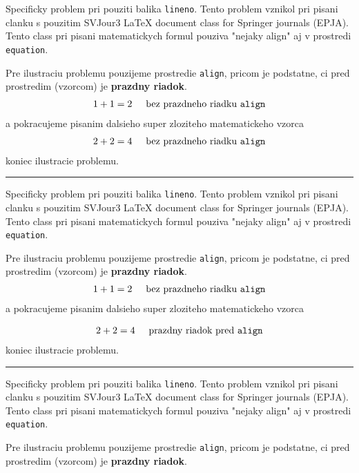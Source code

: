 \documentclass[twocolumn]{article}
\begin{document}
Specificky problem pri pouziti balika \texttt{lineno}. Tento problem vznikol pri
pisani clanku s pouzitim SVJour3 LaTeX document class for Springer journals
(EPJA). Tento class pri pisani matematickych formul pouziva "nejaky align" aj v
prostredi \texttt{equation}.

Pre ilustraciu problemu pouzijeme prostredie \texttt{align}, pricom je
podstatne, ci pred prostredim (vzorcom) je \textbf{prazdny riadok}.
\begin{align}
  1+1=2 \hspace{0.5cm}\text{bez prazdneho riadku }\texttt{align}
\end{align}
a pokracujeme pisanim dalsieho super zloziteho matematickeho vzorca
\begin{align}
  2+2=4 \hspace{0.5cm}\text{bez prazdneho riadku }\texttt{align}
\end{align}
koniec ilustracie problemu.

\vspace{0.5cm}
\hrule
\vspace{0.5cm}
Specificky problem pri pouziti balika \texttt{lineno}. Tento problem vznikol pri
pisani clanku s pouzitim SVJour3 LaTeX document class for Springer journals
(EPJA). Tento class pri pisani matematickych formul pouziva "nejaky align" aj v
prostredi \texttt{equation}.

Pre ilustraciu problemu pouzijeme prostredie \texttt{align}, pricom je
podstatne, ci pred prostredim (vzorcom) je \textbf{prazdny riadok}.
\begin{align}
  1+1=2 \hspace{0.5cm}\text{bez prazdneho riadku }\texttt{align}
\end{align}
a pokracujeme pisanim dalsieho super zloziteho matematickeho vzorca

\begin{align}
  2+2=4 \hspace{0.5cm}\text{prazdny riadok pred }\texttt{align}
\end{align}
koniec ilustracie problemu.

\vspace{0.5cm}
\hrule
\vspace{0.5cm}
Specificky problem pri pouziti balika \texttt{lineno}. Tento problem vznikol pri
pisani clanku s pouzitim SVJour3 LaTeX document class for Springer journals
(EPJA). Tento class pri pisani matematickych formul pouziva "nejaky align" aj v
prostredi \texttt{equation}.

Pre ilustraciu problemu pouzijeme prostredie \texttt{align}, pricom je
podstatne, ci pred prostredim (vzorcom) je \textbf{prazdny riadok}.
\end{document}
